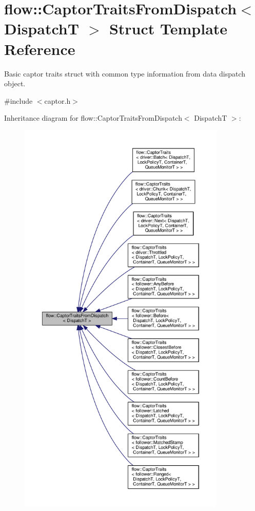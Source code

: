 \hypertarget{structflow_1_1_captor_traits_from_dispatch}{}\section{flow\+:\+:Captor\+Traits\+From\+Dispatch$<$ DispatchT $>$ Struct Template Reference}
\label{structflow_1_1_captor_traits_from_dispatch}


Basic captor traits struct with common type information from data dispatch object.  




{\ttfamily \#include $<$captor.\+h$>$}



Inheritance diagram for flow\+:\+:Captor\+Traits\+From\+Dispatch$<$ DispatchT $>$\+:
\nopagebreak
\begin{figure}[H]
\begin{center}
\leavevmode
\includegraphics[height=550pt]{structflow_1_1_captor_traits_from_dispatch__inherit__graph}
\end{center}
\end{figure}
